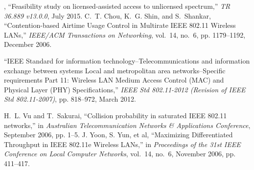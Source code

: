 %

\begin{thebibliography}{99.}%
	, ``Feasibility study on licensed-assisted access to unlicensed spectrum,'' \emph{{TR 36.889 v13.0.0}}, July 2015.
	 C.~T. Chou, K.~G. Shin, and S.~Shankar, ``{Contention-based Airtime Usage Control in Multirate IEEE 802.11 Wireless LANs},'' \emph{{IEEE/ACM Transactions on Networking}}, vol.~14, no.~6, pp. 1179--1192, December 2006.
	
	``{IEEE Standard for information technology--Telecommunications and information exchange between systems Local and metropolitan area networks--Specific requirements Part 11: Wireless LAN Medium Access Control (MAC) and Physical Layer (PHY) Specifications},'' \emph{{IEEE Std 802.11-2012 (Revision of IEEE Std 802.11-2007)}}, pp. 818--972, March 2012.
	
	
	

	
	 H.~L. Vu and T.~Sakurai, ``{Collision probability in saturated IEEE 802.11 networks},'' in \emph{{Australian Telecommunication Networks \& Applications Conference}}, September 2006, pp. 1--5.
	 {J. Yoon, S. Yun, et al}, ``{Maximizing Differentiated Throughput in IEEE 802.11e Wireless LANs},'' in \emph{{ Proceedings of the 31st IEEE Conference on Local Computer Networks}}, vol.~14, no.~6, November 2006, pp. 411--417.
\end{thebibliography}


